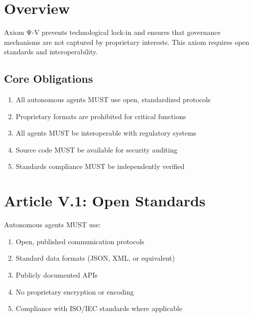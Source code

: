 \vspace{0.5cm}

\section{Overview}

Axiom Ψ-V prevents technological lock-in and ensures that governance mechanisms are not captured by proprietary interests. This axiom requires open standards and interoperability.

\subsection{Core Obligations}

\begin{enumerate}
    \item All autonomous agents MUST use open, standardized protocols
    \item Proprietary formats are prohibited for critical functions
    \item All agents MUST be interoperable with regulatory systems
    \item Source code MUST be available for security auditing
    \item Standards compliance MUST be independently verified
\end{enumerate}

\vspace{0.5cm}

\section{Article V.1: Open Standards}

\begin{articlebox}
Autonomous agents MUST use:
\begin{enumerate}
    \item Open, published communication protocols
    \item Standard data formats (JSON, XML, or equivalent)
    \item Publicly documented APIs
    \item No proprietary encryption or encoding
    \item Compliance with ISO/IEC standards where applicable
\end{enumerate}
\end{articlebox}

\vspace{0.5cm}

